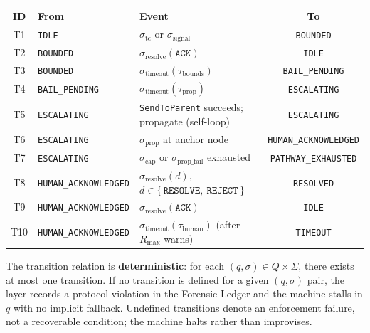 \medskip
\noindent\begin{minipage}{\linewidth}
\label{tab:bp-transitions}
\medskip
\noindent\begin{tabular}{cllc}
\toprule
\textbf{ID} & \textbf{From} & \textbf{Event} & \textbf{To} \\
\midrule
T1 & \texttt{IDLE}                  & $\sigma_{\text{tc}}$ or $\sigma_{\text{signal}}$                      & \texttt{BOUNDED} \\
T2 & \texttt{BOUNDED}               & $\sigma_{\text{resolve}}(\texttt{ACK})$                               & \texttt{IDLE} \\
T3 & \texttt{BOUNDED}               & $\sigma_{\text{timeout}}(\tau_{\text{bounds}})$                      & \texttt{BAIL\_PENDING} \\
T4 & \texttt{BAIL\_PENDING}         & $\sigma_{\text{timeout}}(\tau_{\text{prop}})$                       & \texttt{ESCALATING} \\
T5 & \texttt{ESCALATING}           & \texttt{SendToParent} succeeds; propagate (self-loop)               & \texttt{ESCALATING} \\
T6 & \texttt{ESCALATING}           & $\sigma_{\text{prop}}$ at anchor node                               & \texttt{HUMAN\_ACKNOWLEDGED} \\
T7 & \texttt{ESCALATING}           & $\sigma_{\text{cap}}$ or $\sigma_{\text{prop\_fail}}$ exhausted      & \texttt{PATHWAY\_EXHAUSTED} \\
T8 & \texttt{HUMAN\_ACKNOWLEDGED}  & $\sigma_{\text{resolve}}(d)$, $d \in \{\,\texttt{RESOLVE},\ \texttt{REJECT}\,\}$ & \texttt{RESOLVED} \\
T9 & \texttt{HUMAN\_ACKNOWLEDGED}  & $\sigma_{\text{resolve}}(\texttt{ACK})$                              & \texttt{IDLE} \\
T10 & \texttt{HUMAN\_ACKNOWLEDGED} & $\sigma_{\text{timeout}}(\tau_{\text{human}})$ (after $R_{\max}$ warns) & \texttt{TIMEOUT} \\
\bottomrule
\end{tabular}
\end{minipage}

The transition relation is \textbf{deterministic}: for each $(q, \sigma) \in Q \times \Sigma$, there exists at most one transition. If no transition is defined for a given $(q, \sigma)$ pair, the \fact{} layer records a protocol violation in the Forensic Ledger and the machine stalls in $q$ with no implicit fallback. Undefined transitions denote an enforcement failure, not a recoverable condition; the machine halts rather than improvises.

